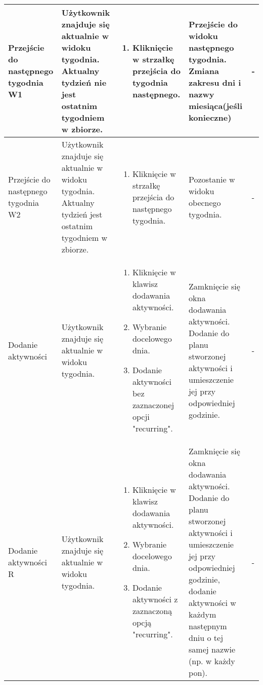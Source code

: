 \documentclass{article}
\begin{document}
\begin{longtable}[H]{| m{3.5cm} | m{3.5cm} | m{3.5cm} | m{3.5cm} | m{3.5cm} |}
	Przejście do następnego tygodnia W1 & Użytkownik znajduje się aktualnie w widoku tygodnia. Aktualny tydzień nie jest ostatnim tygodniem w zbiorze. & \begin{enumerate}[leftmargin =*, 
	topsep=0pt] \item Kliknięcie w strzałkę przejścia do tygodnia następnego. \end{enumerate} & Przejście do widoku następnego tygodnia.  Zmiana zakresu dni i nazwy miesiąca(jeśli konieczne) & 
	- \\ \hline

	Przejście do następnego tygodnia W2 & Użytkownik znajduje się aktualnie w widoku tygodnia. Aktualny tydzień jest ostatnim tygodniem w zbiorze. & \begin{enumerate}[leftmargin =*, 
	topsep=0pt] \item Kliknięcie w strzałkę przejścia do następnego tygodnia. \end{enumerate} & Pozostanie w widoku obecnego tygodnia. & - \\ \hline

	Dodanie aktywności & Użytkownik znajduje się aktualnie w widoku tygodnia. &  \begin{enumerate}[leftmargin =*, topsep=0pt] \item Kliknięcie w klawisz dodawania aktywności. \item Wybranie 
	docelowego dnia. \item Dodanie aktywności bez zaznaczonej opcji "recurring". \end{enumerate} & Zamknięcie się okna dodawania aktywności. Dodanie do planu stworzonej aktywności i 
	umieszczenie jej przy odpowiedniej godzinie. & -  \\ \hline

	Dodanie aktywności R & Użytkownik znajduje się aktualnie w widoku tygodnia. &  \begin{enumerate}[leftmargin =*, topsep=0pt] \item Kliknięcie w klawisz dodawania aktywności. \item Wybranie 
	docelowego dnia.\item Dodanie aktywności z zaznaczoną opcją "recurring". \end{enumerate} & Zamknięcie się okna dodawania aktywności. Dodanie do planu stworzonej aktywności i umieszczenie 
	jej przy odpowiedniej godzinie, dodanie aktywności w każdym następnym dniu o tej samej nazwie (np. w każdy pon). & -  \\ \hline
	

\end{longtable}
\end{document}
